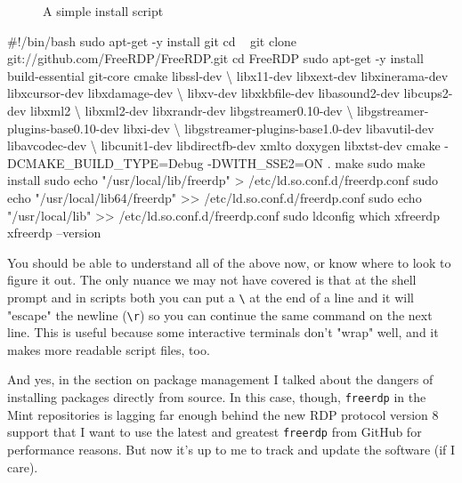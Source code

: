 \documentclass[10pt,american,]{book}
\newenvironment{Shaded}{\begin{snugshade}}{\end{snugshade}}
\newcommand{\KeywordTok}[1]{\textcolor[rgb]{0.13,0.29,0.53}{\textbf{{#1}}}}
\newcommand{\StringTok}[1]{\textcolor[rgb]{0.31,0.60,0.02}{{#1}}}
\newcommand{\CommentTok}[1]{\textcolor[rgb]{0.56,0.35,0.01}{\textit{{#1}}}}
\newcommand{\NormalTok}[1]{{#1}}
\numberwithin{figure}{chapter}
\DeclareRobustCommand{\drcap}[1]{\begin{figure}[H]\caption{#1}\end{figure}}
\renewcommand{\KeywordTok}[1]{{#1}}
\renewcommand{\StringTok}[1]{{#1}}
\renewcommand{\CommentTok}[1]{{#1}}
\renewcommand{\NormalTok}[1]{{#1}}
\begin{document}
\drcap{A simple install script}

\begin{Shaded}
\begin{Highlighting}[]
\CommentTok{#!/bin/bash}
\KeywordTok{sudo} \NormalTok{apt-get -y install git}
\KeywordTok{cd} \NormalTok{~}
\KeywordTok{git} \NormalTok{clone git://github.com/FreeRDP/FreeRDP.git}
\KeywordTok{cd} \NormalTok{FreeRDP}
\KeywordTok{sudo} \NormalTok{apt-get -y install build-essential git-core cmake libssl-dev \textbackslash{}}
  \NormalTok{libx11-dev libxext-dev libxinerama-dev libxcursor-dev libxdamage-dev \textbackslash{}}
  \NormalTok{libxv-dev libxkbfile-dev libasound2-dev libcups2-dev   libxml2 \textbackslash{}}
  \NormalTok{libxml2-dev libxrandr-dev libgstreamer0.10-dev \textbackslash{}}
  \NormalTok{libgstreamer-plugins-base0.10-dev libxi-dev \textbackslash{}}
  \NormalTok{libgstreamer-plugins-base1.0-dev libavutil-dev libavcodec-dev \textbackslash{}}
  \NormalTok{libcunit1-dev libdirectfb-dev xmlto doxygen libxtst-dev}
\KeywordTok{cmake} \NormalTok{-DCMAKE_BUILD_TYPE=Debug -DWITH_SSE2=ON .}
\KeywordTok{make}
\KeywordTok{sudo} \NormalTok{make install}
\KeywordTok{sudo} \NormalTok{echo }\StringTok{"/usr/local/lib/freerdp"} \KeywordTok{>} \NormalTok{/etc/ld.so.conf.d/freerdp.conf}
\KeywordTok{sudo} \NormalTok{echo }\StringTok{"/usr/local/lib64/freerdp"} \KeywordTok{>>} \NormalTok{/etc/ld.so.conf.d/freerdp.conf}
\KeywordTok{sudo} \NormalTok{echo }\StringTok{"/usr/local/lib"} \KeywordTok{>>} \NormalTok{/etc/ld.so.conf.d/freerdp.conf}
\KeywordTok{sudo} \NormalTok{ldconfig}
\KeywordTok{which} \NormalTok{xfreerdp}
\KeywordTok{xfreerdp} \NormalTok{--version}
\end{Highlighting}
\end{Shaded}

You should be able to understand all of the above now, or know where to
look to figure it out. The only nuance we may not have covered is that
at the shell prompt and in scripts both you can put a
\texttt{\textbackslash{}} at the end of a line and it will "escape" the
newline (\texttt{\textbackslash{}r}) so you can continue the same
command on the next line. This is useful because some interactive
terminals don't "wrap" well, and it makes more readable script files,
too.

And yes, in the section on package management I talked about the dangers
of installing packages directly from source. In this case, though,
\texttt{freerdp} in the Mint repositories is lagging far enough behind
the new RDP protocol version 8 support that I want to use the latest and
greatest \texttt{freerdp} from GitHub for performance reasons. But now
it's up to me to track and update the software (if I care).
\end{document}
